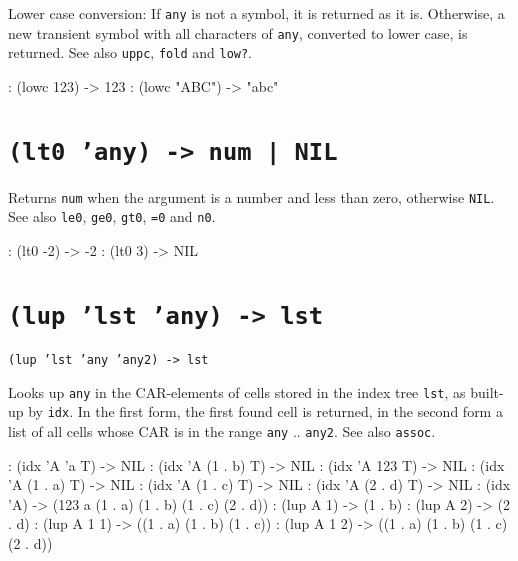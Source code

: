 Lower case conversion: If \texttt{any} is not a symbol, it is returned as it
is. Otherwise, a new transient symbol with all characters of \texttt{any},
converted to lower case, is returned. See also \texttt{uppc}, \texttt{fold} and
\texttt{low?}.


\begin{wideverbatim}
: (lowc 123)
-> 123
: (lowc "ABC")
-> "abc"
\end{wideverbatim}

 
\section*{\texttt{(lt0 'any) -> num | NIL}}
\label{sec:func-ref-L-(lt0 'any) -> num | NIL}


Returns \texttt{num} when the argument is a number and less than zero,
otherwise \texttt{NIL}. See also \texttt{le0}, \texttt{ge0}, \texttt{gt0}, \texttt{=0} and \texttt{n0}.


\begin{wideverbatim}
: (lt0 -2)
-> -2
: (lt0 3)
-> NIL
\end{wideverbatim}

 
\section*{\texttt{(lup 'lst 'any) -> lst}}
\label{sec:func-ref-L-(lup 'lst 'any) -> lst}


\texttt{(lup 'lst 'any 'any2) -> lst}

Looks up \texttt{any} in the CAR-elements of cells stored in the index tree
\texttt{lst}, as built-up by \texttt{idx}. In the first form, the first found cell is
returned, in the second form a list of all cells whose CAR is in the
range \texttt{any} .. \texttt{any2}. See also \texttt{assoc}.


\begin{wideverbatim}
: (idx 'A 'a T)
-> NIL
: (idx 'A (1 . b) T)
-> NIL
: (idx 'A 123 T)
-> NIL
: (idx 'A (1 . a) T)
-> NIL
: (idx 'A (1 . c) T)
-> NIL
: (idx 'A (2 . d) T)
-> NIL
: (idx 'A)
-> (123 a (1 . a) (1 . b) (1 . c) (2 . d))
: (lup A 1)
-> (1 . b)
: (lup A 2)
-> (2 . d)
: (lup A 1 1)
-> ((1 . a) (1 . b) (1 . c))
: (lup A 1 2)
-> ((1 . a) (1 . b) (1 . c) (2 . d))
\end{wideverbatim}

